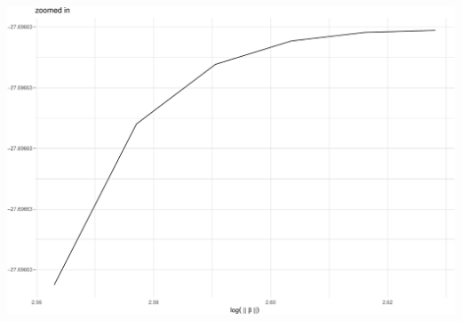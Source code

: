 \documentclass[
  ignorenonframetext,
]{beamer}
\begin{document}
\begin{frame}{}
\protect\hypertarget{section-22}{}
\includegraphics{week7_p2_files/figure-beamer/unnamed-chunk-22-1.pdf}
\end{frame}
\end{document}
